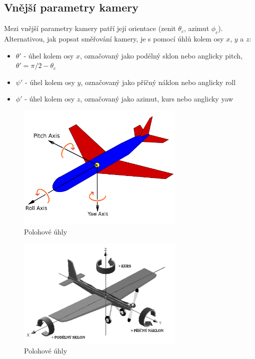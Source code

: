 \subsection{Vnější parametry kamery}

Mezi vnější parametry kamery patří její orientace (zenit $\theta_c$, azimut $\phi_c$).
Alternativou, jak popsat směřování kamery, je s pomocí úhlů kolem osy $x$, $y$ a $z$:

\begin{itemize}
    \item $\theta'$ - úhel kolem osy $x$, označovaný jako podélný sklon nebo anglicky pitch, $\theta' = \pi/2 - \theta_c$
    \item $\psi'$ - úhel kolem osy $y$, označovaný jako příčný náklon nebo anglicky roll
    \item $\phi'$ - úhel kolem osy $z$, označovaný jako azimut, kurs nebo anglicky yaw
\end{itemize}



\begin{figure}[h]\centering
    \includegraphics[width=80mm]{../img/rollpitchyaw}
    \caption{Polohové úhly \cite{rpy}}

\end{figure}

\begin{figure}[h]\centering
    \includegraphics[width=80mm]{../img/naklon}
    \caption{Polohové úhly \citep{Famfulik08}}

\end{figure}

